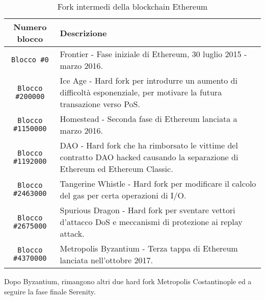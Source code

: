 \begin{table}[]
	\centering
	\begin{tabular}{|c|p{10cm}|}
		\hline
		\textbf{Numero blocco} & \textbf{Descrizione} \\ \hline
		\lstinline|Blocco #0| & Frontier - Fase iniziale di Ethereum, 30 luglio 2015 - marzo 2016.\\ \hline
		\lstinline|Blocco #200000| & Ice Age - Hard fork per introdurre un aumento di difficoltà esponenziale, per motivare la futura transazione verso PoS.\\ \hline
		\lstinline|Blocco #1150000| & Homestead - Seconda fase di Ethereum lanciata a marzo 2016.\\ \hline
		\lstinline|Blocco #1192000| & DAO - Hard fork che ha rimborsato le vittime del contratto DAO hacked causando la separazione di Ethereum ed Ethereum Classic.\\ \hline
		\lstinline|Blocco #2463000| & Tangerine Whistle - Hard fork per modificare il calcolo del gas per certa operazioni di I/O.\\ \hline
		\lstinline|Blocco #2675000| & Spurious Dragon - Hard fork per sventare vettori d'attacco DoS e meccanismi di protezione ai replay attack.\\ \hline
		\lstinline|Blocco #4370000| & Metropolis Byzantium - Terza tappa di Ethereum lanciata nell'ottobre 2017.\\ \hline
	\end{tabular}
	\caption{Fork intermedi della blockchain Ethereum}
	\label{tab:fork-intermedi}
\end{table}
Dopo Byzantium, rimangono altri due hard fork Metropolis Costantinople ed a seguire la fase finale Serenity.

